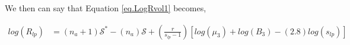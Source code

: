 \documentclass[12pt,letterpaper]{article}
\newcommand{\lr}[1]{\left( #1 \right)}
\newcommand{\lrb}[1]{\left[ #1 \right]}
\newcommand{\schw}{\ensuremath{\mathscr{S}}}
\begin{document}
We then can say that Equation \ref{eq.LogRvol1} becomes,

\begin{align}
log
\lr{
    R_{lp}
}
&=
\lr{n_a+1}   
\schw^{*}
-
\lr{n_a}
\schw
+
\lr{
    \frac{
        r
    }{
        s_{lp}-1
    }
}
\lrb{
    log
    \lr{
        \mu_3
    }
    +
    log
    \lr{
    B_3
    }            
    -
    \lr{2.8}
    log
    \lr{
        s_{lp}
    }
}
\end{align}







\newpage

\end{document}
